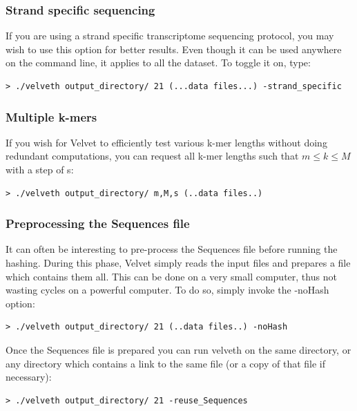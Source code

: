 \documentclass{article}
\begin{document}
\subsubsection{Strand specific sequencing}

If you are using a strand specific transcriptome sequencing protocol, you may wish to use this option for better results. Even though it can be used anywhere on the command line, it applies to all the dataset. To toggle it on, type:

\begin{verbatim}
> ./velveth output_directory/ 21 (...data files...) -strand_specific
\end{verbatim}

\subsubsection{Multiple k-mers}

If you wish for Velvet to efficiently test various k-mer lengths without doing redundant computations, you can request all k-mer lengths such that $m \le k \le M$ with a step of s:

\begin{verbatim}
> ./velveth output_directory/ m,M,s (..data files..)
\end{verbatim}

\subsubsection{Preprocessing the Sequences file}

It can often be interesting to pre-process the Sequences file before running the hashing. During this phase, Velvet simply reads the input files and prepares a file which contains them all. This can be done on a very small computer, thus not wasting cycles on a powerful computer. To do so, simply invoke the -noHash option:

\begin{verbatim}
> ./velveth output_directory/ 21 (..data files..) -noHash
\end{verbatim}

Once the Sequences file is prepared you can run velveth on the same directory, or any directory which contains a link to the same file (or a copy of that file if necessary):

\begin{verbatim}
> ./velveth output_directory/ 21 -reuse_Sequences
\end{verbatim}
\end{document}

